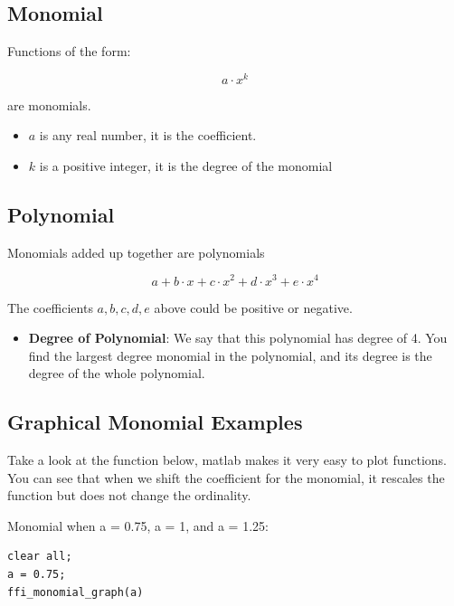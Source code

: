 \documentclass[
]{book}
\providecommand{\tightlist}{%
  \setlength{\itemsep}{0pt}\setlength{\parskip}{0pt}}
\begin{document}
\hypertarget{monomial}{%
\subsection{Monomial}\label{monomial}}

Functions of the form:

\[a\cdot x^k\]

are monomials.

\begin{itemize}
\item
  \(a\) is any real number, it is the coefficient.
\item
  \(k\) is a positive integer, it is the degree of the monomial
\end{itemize}

\hypertarget{polynomial}{%
\subsection{Polynomial}\label{polynomial}}

Monomials added up together are polynomials

\[a+b\cdot x+c\cdot x^2 +d\cdot x^3 +e\cdot x^4\]

The coefficients \(a,b,c,d,e\) above could be positive or negative.

\begin{itemize}
\tightlist
\item
  \textbf{Degree of Polynomial}: We say that this polynomial has degree
  of 4. You find the largest degree monomial in the polynomial, and
  its degree is the degree of the whole polynomial.
\end{itemize}

\hypertarget{graphical-monomial-examples}{%
\subsection{Graphical Monomial Examples}\label{graphical-monomial-examples}}

Take a look at the function below, matlab makes it very easy to plot
functions. You can see that when we shift the coefficient for the
monomial, it rescales the function but does not change the ordinality.

Monomial when a = 0.75, a = 1, and a = 1.25:

\begin{verbatim}
clear all;
a = 0.75;
ffi_monomial_graph(a)
\end{verbatim}
\end{document}
